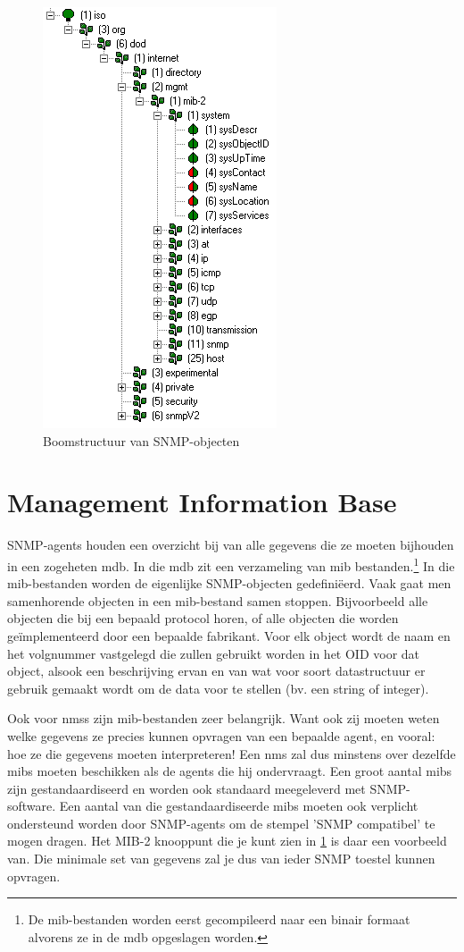 \begin{figure}[h]
	\centering
	\includegraphics{figures/snmp/OID_tree}
	\caption{Boomstructuur van SNMP-objecten}
	\label{boomstructuur}
\end{figure}


\section{Management Information Base}
SNMP-agents houden een overzicht bij van alle gegevens die ze moeten bijhouden in een zogeheten \gls{mdb}.
In die \gls{mdb} zit een verzameling van \gls{mib} bestanden.\footnote{De \gls{mib}-bestanden worden eerst gecompileerd naar een binair formaat
alvorens ze in de \gls{mdb} opgeslagen worden.\cite{moreau}}
In die \gls{mib}-bestanden worden de eigenlijke SNMP-objecten gedefiniëerd. Vaak gaat men samenhorende objecten in een \gls{mib}-bestand samen stoppen.
Bijvoorbeeld alle objecten die bij een bepaald protocol horen, of alle objecten die worden geïmplementeerd door een bepaalde fabrikant.
Voor elk object wordt de naam en het volgnummer vastgelegd die zullen gebruikt worden in het OID voor dat object, alsook een beschrijving ervan en
van wat voor soort datastructuur er gebruik gemaakt wordt om de data voor te stellen (bv. een string of integer).

Ook voor \glspl{nms} zijn \gls{mib}-bestanden zeer belangrijk. Want ook zij moeten weten welke gegevens ze precies kunnen opvragen van een bepaalde
agent, en vooral: hoe ze die gegevens moeten interpreteren! Een \gls{nms} zal dus minstens over dezelfde \glspl{mib} moeten beschikken als de
agents die hij ondervraagt. Een groot aantal \glspl{mib} zijn gestandaardiseerd en worden ook standaard meegeleverd met SNMP-software.
Een aantal van die gestandaardiseerde \glspl{mib} moeten ook verplicht ondersteund worden door SNMP-agents om de stempel 'SNMP compatibel' te mogen dragen.
Het MIB-2 knooppunt die je kunt zien in \cref{boomstructuur} is daar een voorbeeld van.
Die minimale set van gegevens zal je dus van ieder SNMP toestel kunnen opvragen.


